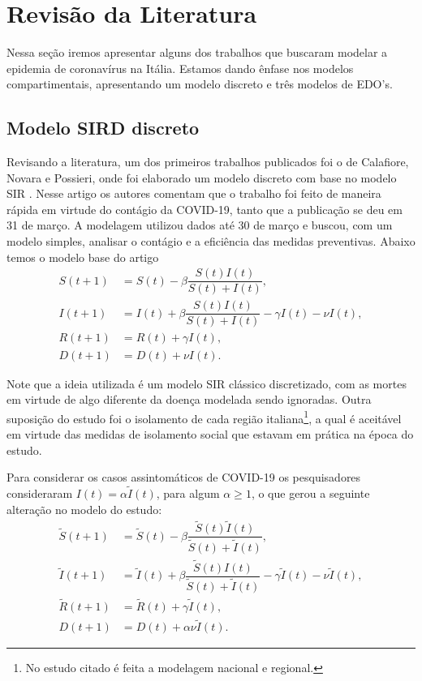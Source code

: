 \documentclass{article}
\begin{document}
\section{Revisão da Literatura}

Nessa seção iremos apresentar alguns dos trabalhos que buscaram modelar a epidemia de coronavírus na Itália. Estamos dando ênfase nos modelos compartimentais, apresentando um modelo discreto e três modelos de EDO's.

\subsection{Modelo SIRD discreto}

Revisando a literatura, um dos primeiros trabalhos publicados foi o de Calafiore, Novara e Possieri, onde foi elaborado um modelo discreto com base no modelo SIR \cite{calafiore2020modified}. Nesse artigo os autores comentam que o trabalho foi feito de maneira rápida em virtude do contágio da COVID-19, tanto que a publicação se deu em 31 de março. A modelagem utilizou dados até 30 de março e buscou, com um modelo simples, analisar o contágio e a eficiência das medidas preventivas. Abaixo temos o modelo base do artigo
\begin{equation*}
    \begin{split}
        S(t + 1) & = S(t) - \beta \dfrac{S(t) I(t)}{S(t) + I(t)}, \\
        I(t + 1) & = I(t) + \beta \dfrac{S(t) I(t)}{S(t) + I(t)} - \gamma I(t) - \nu I(t), \\
        R(t + 1) & = R(t) + \gamma I(t), \\
        D(t + 1) & = D(t) + \nu I(t).
    \end{split}
\end{equation*}

Note que a ideia utilizada é um modelo SIR clássico discretizado, com as mortes em virtude de algo diferente da doença modelada sendo ignoradas. Outra suposição do estudo foi o isolamento de cada região italiana\footnote{No estudo citado é feita a modelagem nacional e regional.}, a qual é aceitável em virtude das medidas de isolamento social que estavam em prática na época do estudo.

Para considerar os casos assintomáticos de COVID-19 os pesquisadores consideraram $I(t) = \alpha\tilde{I}(t)$, para algum $\alpha \geq 1$, o que gerou a seguinte alteração no modelo do estudo:
\begin{equation*}
    \begin{split}
        \tilde{S}(t + 1) & = \tilde{S}(t) - \beta \dfrac{\tilde{S}(t) \tilde{I}(t)}{\tilde{S}(t) + \tilde{I}(t)}, \\
        \tilde{I}(t + 1) & = \tilde{I}(t) + \beta \dfrac{\tilde{S}(t) I(t)}{\tilde{S}(t) + \tilde{I}(t)} - \gamma \tilde{I}(t) - \nu \tilde{I}(t), \\
        \tilde{R}(t + 1) & = \tilde{R}(t) + \gamma \tilde{I}(t), \\
        D(t + 1) & = D(t) + \alpha \nu \tilde{I}(t).
    \end{split}
\end{equation*}
\end{document}
